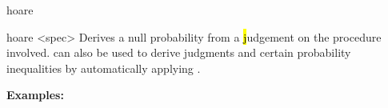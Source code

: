 \begin{tactic}{hoare}
  \begin{tsyntax}{hoare <spec>}
  Derives a null probability from a \hl judgement on the procedure
  involved.  can also be used to derive \phl judgments and
  certain probability inequalities by automatically applying
  .

  \textbf{Examples:}
  \end{tsyntax}
\end{tactic}
